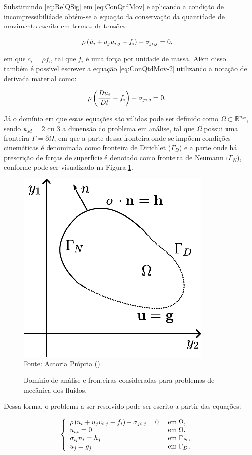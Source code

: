 Substituindo \ref{eq:RelQSig} em \ref{eq:ConQtdMov} e aplicando a condição de incompressibilidade obtém-se a equação da conservação da quantidade de movimento escrita em termos de tensões:

\begin{equation}
    \rho\left({\dot{u}_i+u_ju_{i,j}-f_i}\right)-\sigma_{ji,j}=0\text{,}
    \label{eq:ConQtdMov-2}
\end{equation}

\noindent em que $c_i=\rho f_i$, tal que $f_i$ é uma força por unidade de massa. Além disso, também é possível escrever a equação \ref{eq:ConQtdMov-2} utilizando a notação de derivada material como:

\begin{equation}
    \rho\left({\frac{Du_i}{Dt}-f_i}\right)-\sigma_{ji,j}=0\text{.}
    \label{eq:ConQtdMov-3}
\end{equation}

Já o domínio em que essas equações são válidas pode ser definido como $\Omega\subset\mathbb{R}^{n_{sd}}$, sendo $n_{sd}=2$ ou $3$ a dimensão do problema em análise, tal que $\Omega$ possui uma fronteira $\Gamma=\partial\Omega$, em que a parte dessa fronteira onde se impõem condições cinemáticas é denominada como fronteira de Dirichlet ($\Gamma_D$) e a parte onde há prescrição de forças de superfície é denotado como fronteira de Neumann ($\Gamma_N$), conforme pode ser visualizado na Figura \ref{fig:Dom}.

\begin{figure}[h!]
    \centering
    \caption{Domínio de análise e fronteiras consideradas para problemas de mecânica dos fluidos.}
    \includegraphics[width=.35\linewidth]{Figuras/Dom}
    \\Fonte: Autoria Própria (\the\year).
    \label{fig:Dom}
\end{figure}

Dessa forma, o problema a ser resolvido pode ser escrito a partir das equações:

\begin{equation}
    \left\{
    \begin{array}{ll}
        \rho\left({\dot{u}_i+u_ju_{i,j}-f_i}\right)-\sigma_{ji,j}=0 & \text{ em }\Omega\text{,}   \\
        u_{i,i}=0                                             & \text{ em }\Omega\text{,}   \\
        \sigma_{ij}n_i=h_j                                    & \text{ em }\Gamma_N\text{,} \\
        u_j=g_j                                               & \text{ em }\Gamma_D\text{,}
    \end{array}
    \right.\label{eq:NS-Euler}
\end{equation}

